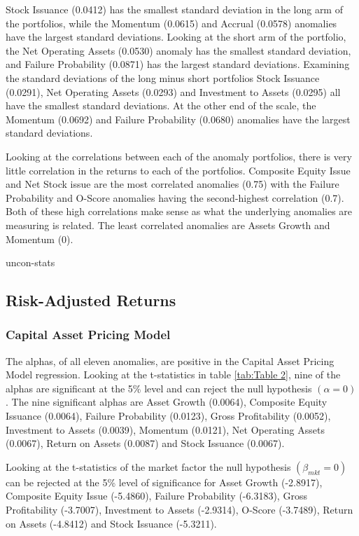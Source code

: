 \documentclass[12pt, a4paper, oneside]{article}
\begin{document}
Stock Issuance (0.0412) has the smallest standard deviation in the long arm of the portfolios, while the Momentum (0.0615) and Accrual (0.0578) anomalies have the largest standard deviations. Looking at the short arm of the portfolio, the Net Operating Assets (0.0530) anomaly has the smallest standard deviation, and Failure Probability (0.0871) has the largest standard deviations. Examining the standard deviations of the long minus short portfolios Stock Issuance (0.0291), Net Operating Assets (0.0293) and Investment to Assets (0.0295) all have the smallest standard deviations. At the other end of the scale, the Momentum (0.0692) and Failure Probability (0.0680) anomalies have the largest standard deviations.

Looking at the correlations between each of the anomaly portfolios, there is very little correlation in the returns to each of the portfolios. Composite Equity Issue and Net Stock issue are the most correlated anomalies (0.75) with the Failure Probability and O-Score anomalies having the second-highest correlation (0.7). Both of these high correlations make sense as what the underlying anomalies are measuring is related. The least correlated anomalies are Assets Growth and Momentum (0).

{uncon-stats}

\subsection{Risk-Adjusted Returns}
\subsubsection{Capital Asset Pricing Model}
The alphas, of all eleven anomalies, are positive in the Capital Asset Pricing Model regression. Looking at the t-statistics in table \ref{tab:Table 2}, nine of the alphas are significant at the 5\% level and can reject the null hypothesis $(\alpha=0)$. The nine significant alphas are Asset Growth (0.0064), Composite Equity Issuance (0.0064), Failure Probability (0.0123), Gross Profitability (0.0052), Investment to Assets (0.0039), Momentum (0.0121), Net Operating Assets (0.0067), Return on Assets (0.0087) and Stock Issuance (0.0067).

Looking at the t-statistics of the market factor the null hypothesis $(\beta_{mkt}= 0)$ can be rejected at the 5\% level of significance for Asset Growth (-2.8917), Composite Equity Issue (-5.4860), Failure Probability (-6.3183), Gross Profitability (-3.7007), Investment to Assets (-2.9314), O-Score (-3.7489), Return on Assets (-4.8412) and Stock Issuance (-5.3211). 
\end{document}
